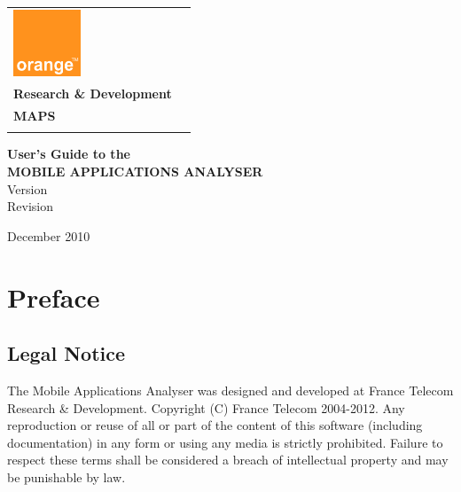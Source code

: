 \documentclass[a4paper]{book}
\newcommand{\ma}{Mobile Applications Analyser\xspace}
\begin{document}
\begin{titlepage}
\begin{center}

\begin{tabular}{p{211pt}p{211pt}}
\includegraphics[width=20mm]{figures/orange} &
\begin{minipage}[b]{200pt} 
\begin{flushright}
\textbf{\large France Telecom} \\
\textbf{\large Research \& Development} \\
\textbf{MAPS}\\[0.5cm]
\mbox{}
\end{flushright}
\end{minipage}
\end{tabular}


\huge

\vfill 

\textbf{\textsf{User's Guide to the}} \\ 
\textbf{{\textsf{MOBILE APPLICATIONS ANALYSER}}} \\ 
\vspace{1cm}
\Large
\textsf{Version \matosversion}\\
\textsf{Revision \matosrevision}\\
\vspace{1cm}

\vfill

\end{center}

\vfill 

December 2010

\end{titlepage} 

\chapter*{Preface}

\section*{Legal Notice}
The \ma was designed and developed at France
Telecom Research \& Development. Copyright (C) France Telecom
2004-2012. Any reproduction or reuse of all or part of the content of
this software (including documentation) in any form or using any media 
is strictly prohibited. Failure to respect these terms shall be considered a
breach of intellectual property and may be punishable by law.
\end{document}
